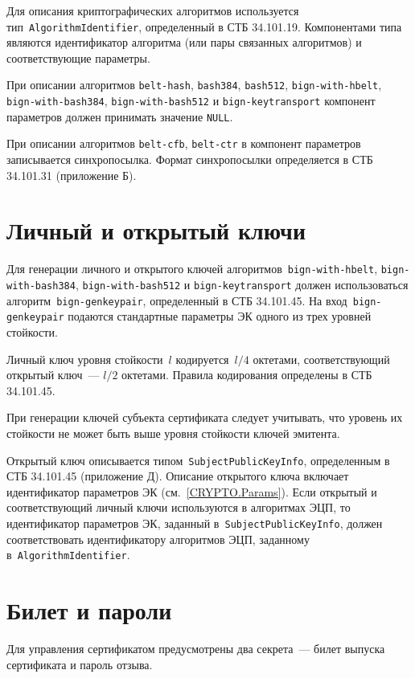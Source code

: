 Для описания криптографических алгоритмов используется 
тип~\texttt{AlgorithmIdentifier}, определенный в СТБ 34.101.19.
Компонентами типа являются идентификатор алгоритма (или пары 
связанных алгоритмов) и соответствующие параметры. 

При описании алгоритмов 
\texttt{belt-hash}, \texttt{bash384}, \texttt{bash512},
\texttt{bign-with-hbelt}, \texttt{bign-with-bash384}, 
\texttt{bign-with-bash512} и \texttt{bign-keytransport} компонент параметров 
должен принимать значение \texttt{NULL}.

При описании алгоритмов \texttt{belt-cfb}, \texttt{belt-ctr}
в компонент параметров записывается синхропосылка.
Формат синхропосылки определяется в СТБ 34.101.31 (приложение Б).

\section{Личный и открытый ключи}\label{CRYPTO.Keypair}

Для генерации личного и открытого ключей алгоритмов~\texttt{bign-with-hbelt}, 
\texttt{bign-with-bash384}, \texttt{bign-with-bash512} и 
\texttt{bign-keytransport} должен использоваться 
алгоритм~\texttt{bign-genkeypair}, определенный в СТБ 34.101.45. 
%
На вход~\texttt{bign-genkeypair} подаются стандартные параметры ЭК одного 
из трех уровней стойкости. 

Личный ключ уровня стойкости~$l$ кодируется~$l/4$ октетами,
соответствующий открытый ключ~--- $l/2$ октетами.
Правила кодирования определены в СТБ 34.101.45.

При генерации ключей субъекта сертификата следует учитывать, что 
уровень их стойкости не может быть выше уровня стойкости ключей эмитента.

Открытый ключ описывается типом~\texttt{SubjectPublicKeyInfo}, 
определенным в СТБ 34.101.45 (приложение Д).
%
Описание открытого ключа включает идентификатор параметров ЭК 
(см.~\ref{CRYPTO.Params}). 
%
Если открытый и соответствующий личный ключи используются в алгоритмах 
ЭЦП, то идентификатор параметров ЭК, заданный в~\texttt{SubjectPublicKeyInfo},
должен соответствовать идентификатору алгоритмов ЭЦП, заданному 
в~\texttt{AlgorithmIdentifier}.

\section{Билет и пароли}\label{CRYPTO.Pwd}

Для управления сертификатом предусмотрены два секрета~---
билет выпуска сертификата и пароль отзыва. 

